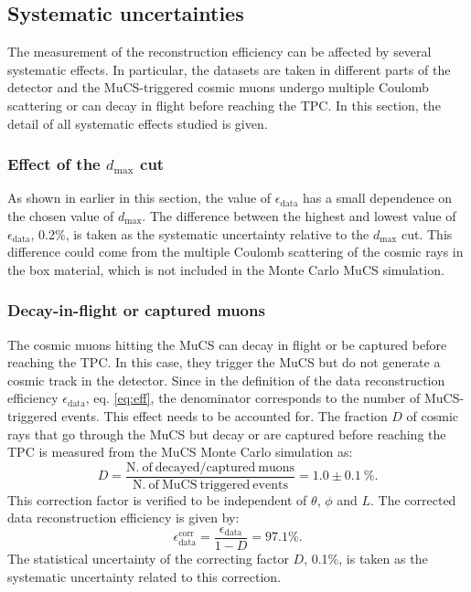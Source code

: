 \documentclass[a4paper,11pt]{article}
\begin{document}
\subsection{Systematic uncertainties}\label{sec:sys}
The measurement of the reconstruction efficiency can be affected by several systematic effects. In particular, the datasets are taken in different parts of the detector and the MuCS-triggered cosmic muons undergo multiple Coulomb scattering or can decay in flight before reaching the TPC. In this section, the detail of all systematic effects studied is given.

\subsubsection{Effect of the $d_{\mathrm{max}}$ cut}

As shown in earlier in this section, the value of $\epsilon_{\mathrm{data}}$ has a small dependence on the chosen value of $d_{\mathrm{max}}$. The difference between the highest and lowest value of $\epsilon_{\mathrm{data}}$, 0.2\%, is taken as the systematic uncertainty relative to the $d_{\mathrm{max}}$ cut. This difference could come from the multiple Coulomb scattering of the cosmic rays in the box material, which is not included in the Monte Carlo MuCS simulation.


\subsubsection{Decay-in-flight or captured muons}\label{sec:dif}
The cosmic muons hitting the MuCS can decay in flight or be captured before reaching the TPC. In this case, they trigger the MuCS but do not generate a cosmic track in the detector. Since in the definition of the data reconstruction efficiency $\epsilon_{\mathrm{data}}$, eq. \eqref{eq:eff}, the denominator corresponds to the number of MuCS-triggered events. This effect needs to be accounted for. The fraction $D$ of cosmic rays that go through the MuCS but decay or are captured before reaching the TPC is measured from the MuCS Monte Carlo simulation as:
\begin{equation}
D = \frac{\mathrm{N.~of~decayed/captured~muons}}{\mathrm{N.~of~MuCS~triggered~events}} = 1.0 \pm 0.1~\%.
\end{equation}
This correction factor is verified to be independent of $\theta$, $\phi$ and $L$. The corrected data reconstruction efficiency is given by:
\begin{equation}
\epsilon_{\mathrm{data}}^{\mathrm{corr}} =  \frac{\epsilon_{\mathrm{data}}}{1-D} = 97.1\%.
\end{equation}
The statistical uncertainty of the correcting factor $D$, 0.1\%, is taken as the systematic uncertainty related to this correction.
\end{document}
